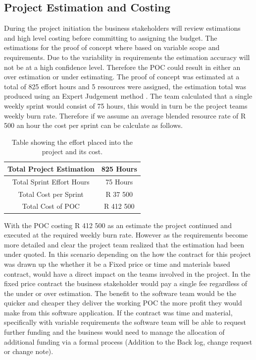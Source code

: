 \documentclass[12pt]{witseiepaper}
\begin{document}
\subsection{Project Estimation and Costing}
During the project initiation the business stakeholders will review estimations and high level costing before committing to assigning the budget. The estimations for the proof of concept where based on variable scope and requirements. Due to the variability in requirements the estimation accuracy will not be at a high confidence level. Therefore the POC could result in either an over estimation or under estimating. The proof of concept was estimated at a total of 825 effort hours and 5 resources were assigned, the estimation total was produced using an Expert Judgement method \cite{ExpertJudgement}. The team calculated that a single weekly sprint would consist of 75 hours, this would in turn be the project teams weekly burn rate. Therefore if we assume an average blended resource rate of R 500 an hour the cost per sprint can be calculate as follows.



\begin{table}[htb] \caption{Table showing the effort placed into the project and its cost.} \label{tbl:cost} 
    \begin{center}
  \begin{tabular}
     {|c|c|} %
    \hline Total Project Estimation &825 Hours\\
    \hline Total Sprint Effort Hours &75 Hours\\
    \hline Total Cost per Sprint &R 37 500\\
    \hline Total Cost of POC & R 412 500 \\
    \hline 
  \end{tabular}
      \end{center}
\end{table}

With the POC costing R 412 500 as an estimate the project continued and executed at the required weekly burn rate. However as the requirements become more detailed and clear the project team realized that the estimation had been under quoted. In this scenario depending on the how the contract for this project was drawn up the whether it be a Fixed price or time and materials based contract, would have a direct impact on the teams involved in the project. In the fixed price contract the business stakeholder would pay a single fee regardless of the under or over estimation. The benefit to the software team would be the quicker and cheaper they deliver the working POC the more profit they would make from this software application. If the contract was time and material, specifically with variable requirements the software team will be able to request further funding and the business would need to manage the allocation of additional funding via a formal process (Addition to the Back log, change request or change note).
\end{document}
